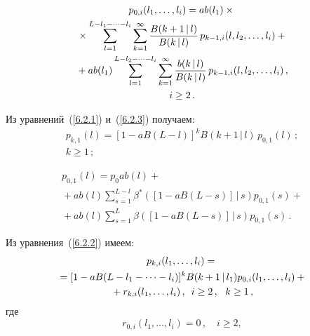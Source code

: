 \begin{multicols}{2}
\vspace*{-9pt}

\noindent
\begin{multline}
p_{0,i}(l_1,\ldots,l_i)
= a b(l_1)\times{}\\
{}\times 
\sum\limits_{l=1}^{L-l_1-\cdots-l_i}
\sum\limits_{k=1}^\infty
\displaystyle\frac{\displaystyle B(k+1\,|\,l) \mathstrut}{\displaystyle  B(k\,|\,l)\mathstrut}\,
p_{k-1,i}(l,l_2,\ldots,l_i)
 +{}
\\
{}+
a b(l_1) \sum\limits_{l=1}^{L-l_2-\cdots-l_i}
\sum\limits_{k=1}^\infty
\displaystyle\frac{\displaystyle b(k\,|\,l) \mathstrut}{\displaystyle B(k\,|\,l)\mathstrut}\,
p_{k-1,i}(l,l_2,\ldots,l_i)\,,
\\
i \ge 2\,.
\label{6.2.4}
\end{multline}

Из уравнений~(\ref{6.2.1}) и~(\ref{6.2.3}) получаем:
\begin{multline}
\label{6.2.5}
p_{k,1}(l)=
[1 - a B(L-l)]^k B(k+1\,|\,l)
\,p_{0,1}(l)\,;
\\ 
k\ge 1\,;
\end{multline}

\vspace*{-9pt}

\noindent
\begin{multline}
\label{6.2.6}
p_{0,1}(l)= p_0 a b(l)+{}\\
{}+
a b(l)\sum\limits_{s=1}^{L-l}
\beta^*([1 - a B(L-s)]\,|\,s)
p_{0,1}(s)
 +{}
\\
{}+
a b(l)
\sum\limits_{s=1}^{L}
\beta([1 - a B(L-s)]\,|\,s)
p_{0,1}(s)\,.
\end{multline}

Из уравнения~(\ref{6.2.2}) имеем:
\begin{multline}
p_{k,i}(l_1,\ldots,l_i)
={}\\
{}=[1 - a B(L-l_1-\cdots-l_i)]^k
B(k+1\,|\,l_1) p_{0,i}(l_1,\ldots,l_i)
+{}
\\
{}+r_{k,i}(l_1,\ldots,l_i)\,,
\enskip
i \ge 2\,,\ \ k\ge 1\,,
\label{6.2.7}
\end{multline}
где
\begin{equation}
\label{6.2.8}
r_{0,i}(l_1,\ldots,l_i)
= 0\,,\quad
i \ge 2,
\end{equation}

\vspace*{-9pt}


\end{multicols}
